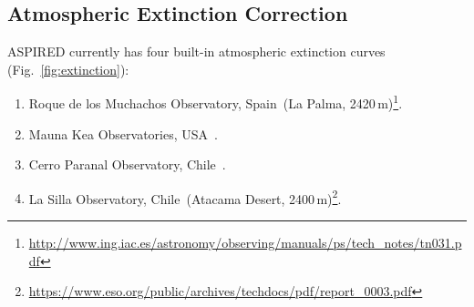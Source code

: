 \documentclass[linenumbers, twocolumn]{aastex631}
\begin{document}
\subsection{Atmospheric Extinction Correction}
\textsc{ASPIRED} currently has four built-in atmospheric extinction curves (Fig.~\ref{fig:extinction}):

\begin{enumerate}
    \item Roque de los Muchachos Observatory, Spain~(La Palma, 2420\,m)\footnote{\url{http://www.ing.iac.es/astronomy/observing/manuals/ps/tech\_notes/tn031.pdf}}.
    \item Mauna Kea Observatories, USA~\citep[Big Island, Hawaii, 4205\,m;][]{2013A&A...549A...8B}.
    \item Cerro Paranal Observatory, Chile~\citep[Atacama Desert, 2635\,m;][]{2011A&A...527A..91P}.
    \item La Silla Observatory, Chile~(Atacama Desert, 2400\,m)\footnote{\url{https://www.eso.org/public/archives/techdocs/pdf/report\_0003.pdf}}.
\end{enumerate}
\end{document}
